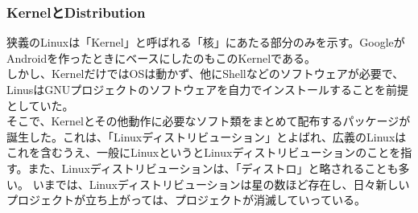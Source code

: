 \documentclass{ltjsarticle}
\begin{document}
\subsubsection{KernelとDistribution}
狭義のLinuxは「Kernel」と呼ばれる「核」にあたる部分のみを示す。GoogleがAndroidを作ったときにベースにしたのもこのKernelである。\\
しかし、KernelだけではOSは動かず、他にShellなどのソフトウェアが必要で、LinusはGNUプロジェクトのソフトウェアを自力でインストールすることを前提としていた。\\
そこで、Kernelとその他動作に必要なソフト類をまとめて配布するパッケージが誕生した。これは、「Linuxディストリビューション」とよばれ、広義のLinuxはこれを含むうえ、一般にLinuxというとLinuxディストリビューションのことを指す。また、Linuxディストリビューションは、「ディストロ」と略されることも多い。
いまでは、Linuxディストリビューションは星の数ほど存在し、日々新しいプロジェクトが立ち上がっては、プロジェクトが消滅していっている。
\end{document}
